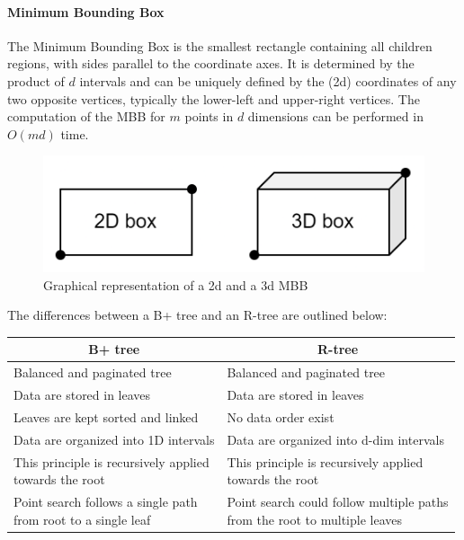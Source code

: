 \paragraph*{Minimum Bounding Box}
The Minimum Bounding Box is the smallest rectangle containing all children regions, with sides parallel to the coordinate axes.
It is determined by the product of $d$ intervals and can be uniquely defined by the (2d) coordinates of any two opposite vertices, typically the lower-left and upper-right vertices.
The computation of the MBB for $m$ points in $d$ dimensions can be performed in $O(md)$ time.
\begin{figure}[H]
    \centering
    \includegraphics[width=0.5\linewidth]{images/MBB.png}
    \caption{Graphical representation of a 2d and a 3d MBB}
\end{figure}
The differences between a B+ tree and an R-tree are outlined below: 
\begin{table}[H]
    \centering
    \begin{tabular}{ll}
    \hline
    \multicolumn{1}{c}{\textbf{B+ tree}}                                                & \multicolumn{1}{c}{\textbf{R-tree}}                                                               \\ \hline
    Balanced and paginated tree                                                         & Balanced and paginated tree                                                                       \\
    Data are stored in leaves                                                           & Data are stored in leaves                                                                         \\
    Leaves are kept sorted and linked                                                   & No data order exist                                                                               \\
    Data are organized into 1D intervals                                                & Data are organized into d-dim intervals                                                           \\
    \makecell[l]{This principle is recursively applied \\ towards the root}             & \makecell[l]{This principle is recursively applied \\ towards the root}                           \\
    \makecell[l]{Point search follows a single path \\ from root to a single leaf}      & \makecell[l]{Point search could follow multiple paths \\ from the root to multiple leaves}        \\ \hline
    \end{tabular}
\end{table}

